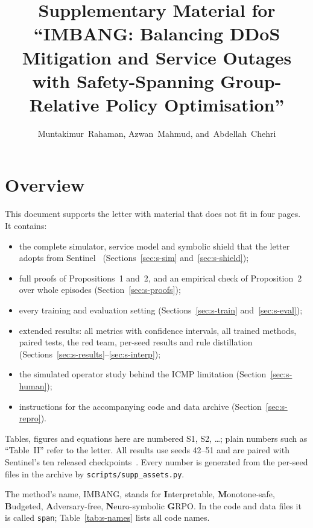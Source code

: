 \documentclass[10pt,journal,onecolumn]{IEEEtran}
\begin{document}
\title{Supplementary Material for\\ ``IMBANG: Balancing DDoS Mitigation and Service Outages with Safety-Spanning Group-Relative Policy Optimisation''}

\author{Muntakimur~Rahaman, Azwan~Mahmud, and~Abdellah~Chehri}


\maketitle

\section{Overview}
This document supports the letter with material that does not fit in four pages. It contains:
\begin{itemize}
\item the complete simulator, service model and symbolic shield that the letter adopts from Sentinel~\cite{alfatemi2026sentinel} (Sections~\ref{sec:s-sim} and~\ref{sec:s-shield});
\item full proofs of Propositions~1 and~2, and an empirical check of Proposition~2 over whole episodes (Section~\ref{sec:s-proofs});
\item every training and evaluation setting (Sections~\ref{sec:s-train} and~\ref{sec:s-eval});
\item extended results: all metrics with confidence intervals, all trained methods, paired tests, the red team, per-seed results and rule distillation (Sections~\ref{sec:s-results}--\ref{sec:s-interp});
\item the simulated operator study behind the ICMP limitation (Section~\ref{sec:s-human});
\item instructions for the accompanying code and data archive (Section~\ref{sec:s-repro}).
\end{itemize}
Tables, figures and equations here are numbered S1, S2, \dots; plain numbers such as ``Table~II'' refer to the letter. All results use seeds 42--51 and are paired with Sentinel's ten released checkpoints~\cite{sentinelcode}. Every number is generated from the per-seed files in the archive by \texttt{scripts/supp\_assets.py}.

The method's name, IMBANG, stands for \textbf{I}nterpretable, \textbf{M}onotone-safe, \textbf{B}udgeted, \textbf{A}dversary-free, \textbf{N}euro-symbolic \textbf{G}RPO. In the code and data files it is called \texttt{span}; Table~\ref{tab:s-names} lists all code names.
\end{document}
